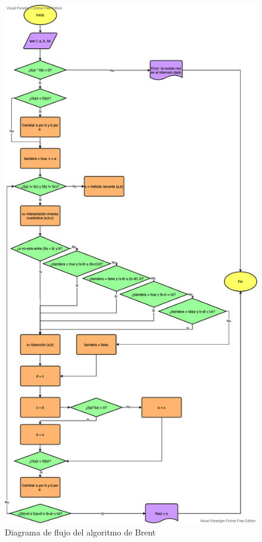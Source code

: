 \documentclass[a4paper,12pt]{article}
\begin{document}
\begin{figure}[h!]
\centering
\includegraphics[scale=0.3]{img/flujograma_brent.png}
\vspace{-1em}
\caption{Diagrama de flujo del algoritmo de Brent}
\label{fig:flujograma_brent}
\end{figure}
\end{document}
